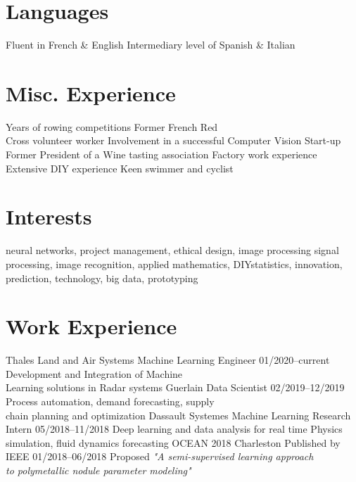 \documentclass[]{source}
\begin{document}
\begin{aside}
\section{Languages}
\vspace{0.6cm}
Fluent in
\vspace{0.3cm}
French \& English
\vspace{0.3cm}
Intermediary level of
\vspace{0.3cm}
Spanish \& Italian 
\section{Misc. Experience}
\vspace{0.6cm}
Years of rowing competitions
\vspace{0.3cm}
Former French Red \\
Cross volunteer worker
\vspace{0.3cm}
Involvement in a successful Computer Vision Start-up
\vspace{0.3cm}
Former President of a Wine tasting association
\vspace{0.3cm}
Factory work experience
\vspace{0.3cm}
Extensive DIY experience
\vspace{0.3cm}
Keen swimmer and cyclist
\end{aside}
\section{Interests}
neural networks, project management, ethical design, image processing\newline
signal processing, image recognition, applied mathematics, DIY\newline statistics, innovation, prediction, technology, big data, prototyping
\bigskip
\section{Work Experience} 
\begin{entrylist}
\medskip
\entry
{\footnotesize{Thales Land and Air Systems}}
{Machine Learning Engineer}
{01/2020–current}
{Development and Integration of Machine \\
Learning solutions in Radar systems}
\medskip
\entry
{\footnotesize{Guerlain}}
{Data Scientist}
{02/2019–12/2019}
{Process automation, demand forecasting, supply \\
chain planning and optimization}
\medskip
\entry
{\footnotesize{Dassault Systemes}}
{Machine Learning Research Intern}
{05/2018–11/2018}
{Deep learning and data analysis for real time Physics\\
simulation, fluid dynamics forecasting}
\entry
{\footnotesize{OCEAN 2018 Charleston}}
{Published by IEEE}
{01/2018–06/2018}
{Proposed \textit{"A semi-supervised learning approach\\
 to polymetallic nodule parameter modeling"}}
\end{entrylist}
\end{document}
